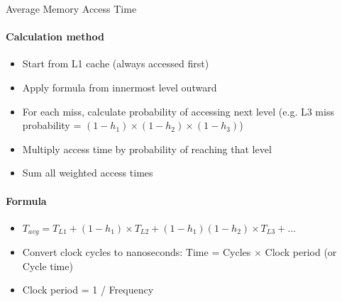 \begin{KR}{Average Memory Access Time}
    
    \paragraph{Calculation method}
    \begin{itemize}
        \item Start from L1 cache (always accessed first)
        \item Apply formula from innermost level outward
        \item For each miss, calculate probability of accessing next level (e.g. L3 miss probability = $(1-h_1) \times (1-h_2) \times (1-h_3)$)
        \item Multiply access time by probability of reaching that level
        \item Sum all weighted access times
    \end{itemize}
    
    \paragraph{Formula}
    \begin{itemize}
        \item $T_{avg} = T_{L1} + (1-h_1) \times T_{L2} + (1-h_1)(1-h_2) \times T_{L3} + \ldots$
        \item Convert clock cycles to nanoseconds: Time = Cycles $\times$ Clock period (or Cycle time)
        \item Clock period = 1 / Frequency
    \end{itemize}
\end{KR}

